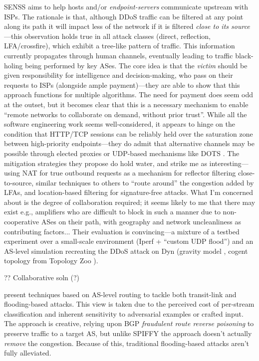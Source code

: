 SENSS \cite{DBLP:conf/acsac/RamanathanMYZ18} aims to help hosts and/or \emph{endpoint-servers} communicate upstream with ISPs.
The rationale is that, although DDoS traffic can be filtered at any point along its path it will impact less of the network if it is filtered \emph{close to its source}---this observation holds true in all attack classes (direct, reflection, LFA/crossfire), which exhibit a tree-like pattern of traffic.
This information currently propagates through human channels, eventually leading to traffic black-holing being performed by key ASes.
The core idea is that the \emph{victim} should be given responsibility for intelligence and decision-making, who pass on their requests to ISPs (alongside ample payment)---they are able to show that this approach functions for multiple algorithms.
The need for payment does seem odd at the outset, but it becomes clear that this is a necessary mechanism to enable ``remote networks to collaborate on demand, without prior trust''.
While all the software engineering work seems well-considered, it appears to hinge on the condition that HTTP/TCP sessions can be reliably held over the saturation zone between high-priority endpoints---they do admit that alternative channels may be possible through elected proxies or UDP-based mechanisms like DOTS \cite{ietf-dots-use-cases-17}.
The mitigation strategies they propose do hold water, and strike me as interesting---using NAT for true outbound requests as a mechanism for reflector filtering close-to-source, similar techniques to others to ``route around'' the congestion added by LFAs, and location-based filtering for signature-free attacks.
What I'm concerned about is the degree of collaboration required; it seems likely to me that there may exist e.g., amplifiers who are difficult to block in such a manner due to non-cooperative ASes on their path, with geography and network uncleanliness as contributing factors...
Their evaluation is convincing---a mixture of a testbed experiment over a small-scale environment (Iperf + ``custom UDP flood'') and an AS-level simulation recreating the DDoS attack on Dyn (gravity model \cite{DBLP:journals/ccr/Roughan05}, cogent topology from Topology Zoo \cite{topology-zoo}).

?? Collaborative soln (?) \cite{DBLP:journals/tnsm/SimpsonSMJPH18}

\Textcite{DBLP:conf/sp/SmithS18} present techniques based on AS-level routing to tackle both transit-link and flooding-based attacks.
This view is taken due to the perceived cost of per-stream classification and inherent sensitivity to adversarial examples or crafted input.
The approach is creative, relying upon BGP \emph{fraudulent route reverse poisoning} to preserve traffic to a target AS, but unlike SPIFFY the approach doesn't actually \emph{remove} the congestion.
Because of this, traditional flooding-based attacks aren't fully alleviated.

